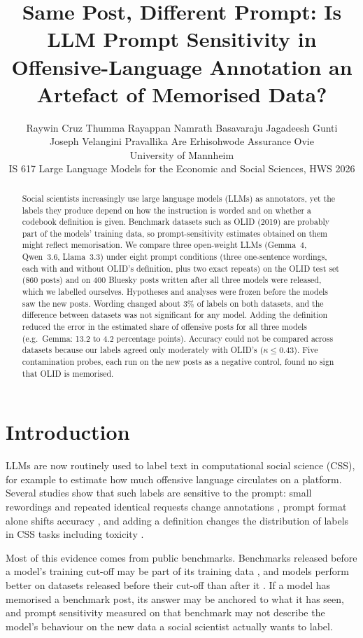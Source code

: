 \documentclass[11pt]{article}
\title{Same Post, Different Prompt: Is LLM Prompt Sensitivity in\\Offensive-Language Annotation an Artefact of Memorised Data?}
\author{Raywin Cruz Thumma Rayappan \quad Namrath Basavaraju \quad Jagadeesh Gunti \\
  Joseph Velangini Pravallika Are \quad Erhisohwode Assurance Ovie \\
  University of Mannheim \\
  IS 617 Large Language Models for the Economic and Social Sciences, HWS 2026}
\begin{document}
\maketitle

\begin{abstract}
Social scientists increasingly use large language models (LLMs) as annotators, yet the labels they produce depend on how the instruction is worded and on whether a codebook definition is given. Benchmark datasets such as OLID (2019) are probably part of the models' training data, so prompt-sensitivity estimates obtained on them might reflect memorisation. We compare three open-weight LLMs (Gemma~4, Qwen~3.6, Llama~3.3) under eight prompt conditions (three one-sentence wordings, each with and without OLID's definition, plus two exact repeats) on the OLID test set (860 posts) and on 400 Bluesky posts written after all three models were released, which we labelled ourselves. Hypotheses and analyses were frozen before the models saw the new posts. Wording changed about 3\% of labels on both datasets, and the difference between datasets was not significant for any model. Adding the definition reduced the error in the estimated share of offensive posts for all three models (e.g.\ Gemma: 13.2 to 4.2 percentage points). Accuracy could not be compared across datasets because our labels agreed only moderately with OLID's ($\kappa \le 0.43$). Five contamination probes, each run on the new posts as a negative control, found no sign that OLID is memorised.
\end{abstract}

\section{Introduction}

LLMs are now routinely used to label text in computational social science (CSS), for example to estimate how much offensive language circulates on a platform. Several studies show that such labels are sensitive to the prompt: small rewordings and repeated identical requests change annotations \citep{reiss2023testing}, prompt format alone shifts accuracy \citep{sclar2024quantifying,mizrahi2024state}, and adding a definition changes the distribution of labels in CSS tasks including toxicity \citep{atreja2025prompt}.

Most of this evidence comes from public benchmarks. Benchmarks released before a model's training cut-off may be part of its training data \citep{golchin2024time}, and models perform better on datasets released before their cut-off than after it \citep{li2024task}. If a model has memorised a benchmark post, its answer may be anchored to what it has seen, and prompt sensitivity measured on that benchmark may not describe the model's behaviour on the new data a social scientist actually wants to label.
\end{document}
